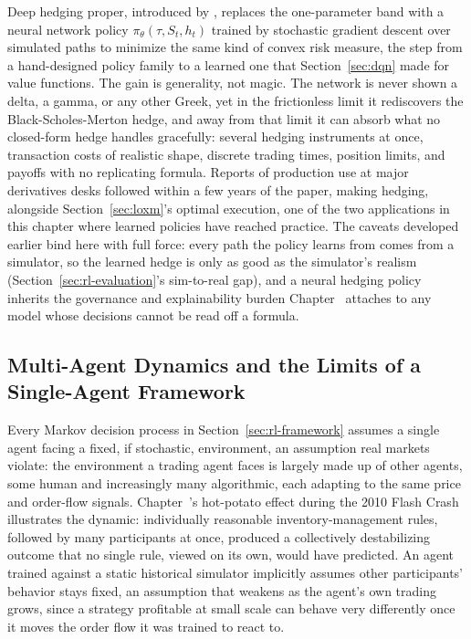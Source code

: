 \documentclass[../ai_in_finance]{subfiles}
\begin{document}
Deep hedging proper, introduced by \textcite{buehler2019deep}, replaces the one-parameter band with a neural network policy $\pi_\theta(\tau, S_t, h_t)$ trained by stochastic gradient descent over simulated paths to minimize the same kind of convex risk measure, the step from a hand-designed policy family to a learned one that Section~\ref{sec:dqn} made for value functions. The gain is generality, not magic. The network is never shown a delta, a gamma, or any other Greek, yet in the frictionless limit it rediscovers the Black-Scholes-Merton hedge, and away from that limit it can absorb what no closed-form hedge handles gracefully: several hedging instruments at once, transaction costs of realistic shape, discrete trading times, position limits, and payoffs with no replicating formula. Reports of production use at major derivatives desks followed within a few years of the paper, making hedging, alongside Section~\ref{sec:loxm}'s optimal execution, one of the two applications in this chapter where learned policies have reached practice. The caveats developed earlier bind here with full force: every path the policy learns from comes from a simulator, so the learned hedge is only as good as the simulator's realism (Section~\ref{sec:rl-evaluation}'s sim-to-real gap), and a neural hedging policy inherits the governance and explainability burden Chapter~ attaches to any model whose decisions cannot be read off a formula.

\subsection{Multi-Agent Dynamics and the Limits of a Single-Agent Framework}
\label{sec:rl-multiagent}

Every Markov decision process in Section~\ref{sec:rl-framework} assumes a single agent facing a fixed, if stochastic, environment, an assumption real markets violate: the environment a trading agent faces is largely made up of other agents, some human and increasingly many algorithmic, each adapting to the same price and order-flow signals. Chapter~'s hot-potato effect during the 2010 Flash Crash illustrates the dynamic: individually reasonable inventory-management rules, followed by many participants at once, produced a collectively destabilizing outcome that no single rule, viewed on its own, would have predicted. An agent trained against a static historical simulator implicitly assumes other participants' behavior stays fixed, an assumption that weakens as the agent's own trading grows, since a strategy profitable at small scale can behave very differently once it moves the order flow it was trained to react to.
\end{document}
